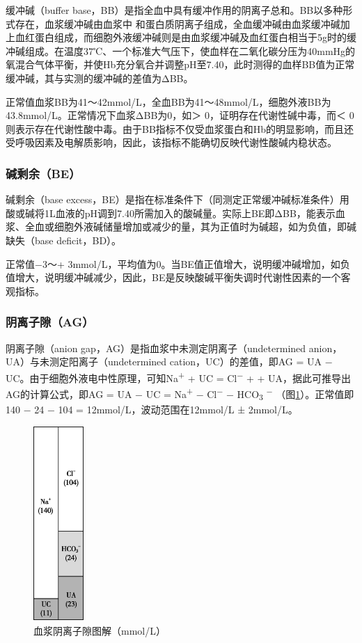 缓冲碱（buffer
base，BB）是指全血中具有缓冲作用的阴离子总和。BB以多种形式存在，血浆缓冲碱由血浆中{}
和蛋白质阴离子组成，全血缓冲碱由血浆缓冲碱加上血红蛋白组成，而细胞外液缓冲碱则是由血浆缓冲碱及血红蛋白相当于5g时的缓冲碱组成。在温度37℃、一个标准大气压下，使血样在二氧化碳分压为40mmHg的氧混合气体平衡，并使Hb充分氧合并调整pH至7.40，此时测得的血样BB值为正常缓冲碱，其与实测的缓冲碱的差值为ΔBB。

正常值血浆BB为41～42mmol/L，全血BB为41～48mmol/L，细胞外液BB为43.8mmol/L。正常情况下血浆ΔBB为0，如＞
0，证明存在代谢性碱中毒，而＜
0则表示存在代谢性酸中毒。由于BB指标不仅受血浆蛋白和Hb的明显影响，而且还受呼吸因素及电解质影响，因此，该指标不能确切反映代谢性酸碱内稳状态。

\subsubsection{碱剩余（BE）}

碱剩余（base
excess，BE）是指在标准条件下（同测定正常缓冲碱标准条件）用酸或碱将1L血液的pH调到7.40所需加入的酸碱量。实际上BE即ΔBB，能表示血浆、全血或细胞外液碱储量增加或减少的量，其为正值时为碱超，如为负值，即碱缺失（base
deficit，BD）。

正常值−3～+
3mmol/L，平均值为0。当BE值正值增大，说明缓冲碱增加，如负值增大，说明缓冲碱减少，因此，BE是反映酸碱平衡失调时代谢性因素的一个客观指标。

\subsubsection{阴离子隙（AG）}

阴离子隙（anion gap，AG）是指血浆中未测定阴离子（undetermined
anion，UA）与未测定阳离子（undetermined cation，UC）的差值，即AG = UA −
UC。由于细胞外液电中性原理，可知Na\textsuperscript{+} + UC =
Cl\textsuperscript{−} +{} + UA，据此可推导出AG的计算公式，即AG = UA − UC
= Na\textsuperscript{+} − Cl\textsuperscript{−} − HCO\textsubscript{3}
\textsuperscript{−} （图\ref{fig68-1}）。正常值即140 − 24 − 104 =
12mmol/L，波动范围在12mmol/L ± 2mmol/L。

\begin{figure}[!htbp]
 \centering
 \includegraphics[width=0.75in,height=2.91667in]{./images/Image00256.jpg}
 \captionsetup{justification=centering}
 \caption{血浆阴离子隙图解（mmol/L）}
 \label{fig68-1}
  \end{figure} 

